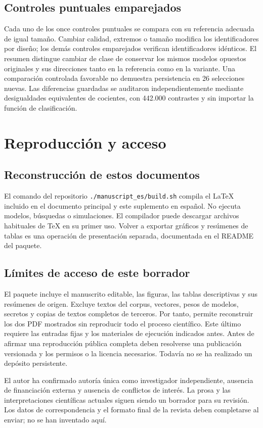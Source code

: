 \documentclass[12pt]{article}
\begin{document}
\subsection{Controles puntuales emparejados}
Cada uno de los once controles puntuales se compara con su referencia adecuada de igual tamaño. Cambiar calidad, extremos o tamaño modifica los identificadores por diseño; los demás controles emparejados verifican identificadores idénticos. El resumen distingue cambiar de clase de conservar los mismos modelos opuestos originales y sus direcciones tanto en la referencia como en la variante. Una comparación controlada favorable no demuestra persistencia en 26 selecciones nuevas. Las diferencias guardadas se auditaron independientemente mediante desigualdades equivalentes de cocientes, con 442.000 contrastes y sin importar la función de clasificación.

\FloatBarrier

\section{Reproducción y acceso}

\subsection{Reconstrucción de estos documentos}
El comando del repositorio \nolinkurl{./manuscript_es/build.sh} compila el LaTeX incluido en el documento principal y este suplemento en español. No ejecuta modelos, búsquedas o simulaciones. El compilador puede descargar archivos habituales de TeX en su primer uso. Volver a exportar gráficos y resúmenes de tablas es una operación de presentación separada, documentada en el README del paquete.

\subsection{Límites de acceso de este borrador}
El paquete incluye el manuscrito editable, las figuras, las tablas descriptivas y sus resúmenes de origen. Excluye textos del corpus, vectores, pesos de modelos, secretos y copias de textos completos de terceros. Por tanto, permite reconstruir los dos PDF mostrados sin reproducir todo el proceso científico. Este último requiere las entradas fijas y los materiales de ejecución indicados antes. Antes de afirmar una reproducción pública completa deben resolverse una publicación versionada y los permisos o la licencia necesarios. Todavía no se ha realizado un depósito persistente.

El autor ha confirmado autoría única como investigador independiente, ausencia de financiación externa y ausencia de conflictos de interés. La prosa y las interpretaciones científicas actuales siguen siendo un borrador para su revisión. Los datos de correspondencia y el formato final de la revista deben completarse al enviar; no se han inventado aquí.

\FloatBarrier


\end{document}

